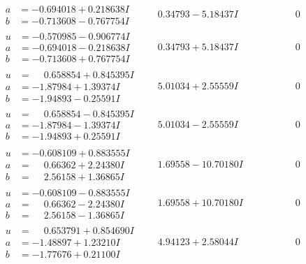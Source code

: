 \documentclass[1p]{elsarticle_modified}
\theoremstyle{definition}
\begin{document}
$$\begin{array}{c|c|c}
\begin{aligned}
a &= -0.694018 + 0.218638 I \\
b &= -0.713608 - 0.767754 I\end{aligned}
 & \phantom{-}0.34793 - 5.18437 I & \phantom{-0.000000 } 0 \\ \hline\begin{aligned}
u &= -0.570985 - 0.906774 I \\
a &= -0.694018 - 0.218638 I \\
b &= -0.713608 + 0.767754 I\end{aligned}
 & \phantom{-}0.34793 + 5.18437 I & \phantom{-0.000000 } 0 \\ \hline\begin{aligned}
u &= \phantom{-}0.658854 + 0.845395 I \\
a &= -1.87984 + 1.39374 I \\
b &= -1.94893 - 0.25591 I\end{aligned}
 & \phantom{-}5.01034 + 2.55559 I & \phantom{-0.000000 } 0 \\ \hline\begin{aligned}
u &= \phantom{-}0.658854 - 0.845395 I \\
a &= -1.87984 - 1.39374 I \\
b &= -1.94893 + 0.25591 I\end{aligned}
 & \phantom{-}5.01034 - 2.55559 I & \phantom{-0.000000 } 0 \\ \hline\begin{aligned}
u &= -0.608109 + 0.883555 I \\
a &= \phantom{-}0.66362 + 2.24380 I \\
b &= \phantom{-}2.56158 + 1.36865 I\end{aligned}
 & \phantom{-}1.69558 - 10.70180 I & \phantom{-0.000000 } 0 \\ \hline\begin{aligned}
u &= -0.608109 - 0.883555 I \\
a &= \phantom{-}0.66362 - 2.24380 I \\
b &= \phantom{-}2.56158 - 1.36865 I\end{aligned}
 & \phantom{-}1.69558 + 10.70180 I & \phantom{-0.000000 } 0 \\ \hline\begin{aligned}
u &= \phantom{-}0.653791 + 0.854690 I \\
a &= -1.48897 + 1.23210 I \\
b &= -1.77676 + 0.21100 I\end{aligned}
 & \phantom{-}4.94123 + 2.58044 I & \phantom{-0.000000 } 0 \\ \hline\begin{aligned}

\end{aligned}
\end{array}$$
\end{document}
